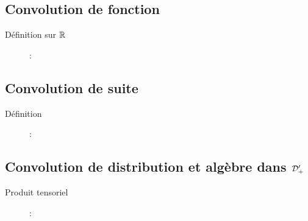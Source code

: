 \subsection{Convolution de fonction}
\begin{description}
\item[Définition sur $\mathbb{R}$] :
\end{description}

\subsection{Convolution de suite}
\begin{description}
\item[Définition] : 
\end{description}

\subsection{Convolution de distribution et algèbre dans $\mathcal{D}'_+$}
\begin{description}
\item[Produit tensoriel] : 
\end{description}
